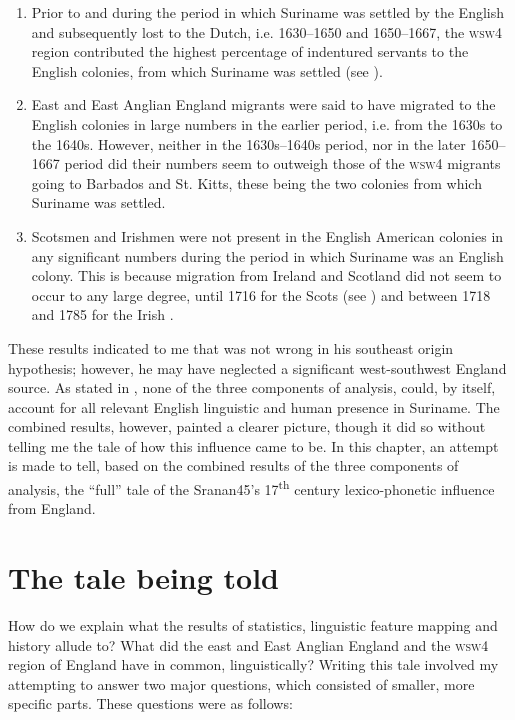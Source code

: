 \begin{enumerate}
\item{Prior to and during the period in which Suriname was settled by the English and subsequently lost to the Dutch, i.e. 1630--1650 and 1650--1667, the \textsc{wsw4} region contributed the highest percentage of indentured servants to the English colonies, from which Suriname was settled (see ).}
\item{East and East Anglian England migrants were said to have migrated to the English colonies in large numbers in the earlier period, i.e. from the 1630s to the 1640s. However, neither in the 1630s--1640s period, nor in the later 1650--1667 period did their numbers seem to outweigh those of the \textsc{wsw4} migrants going to Barbados and St. Kitts, these being the two colonies from which Suriname was settled.}
\item{Scotsmen and Irishmen were not present in the English American colonies in any significant numbers during the period in which Suriname was an English colony. This is because migration from Ireland and Scotland did not seem to occur to any large degree, until 1716 for the Scots (see \citealt{Dobson05}) and between 1718 and 1785 for the Irish \citep{Griffin01}.}
\end{enumerate}

These results indicated to me that \citet{Smith87, Smith08} was not wrong in his southeast origin hypothesis; however, he may have neglected a significant west-southwest England source. As stated in , none of the three components of analysis, could, by itself, account for all relevant English linguistic and human presence in Suriname. The combined results, however, painted a clearer picture, though it did so without telling me the tale of how this influence came to be. In this chapter, an attempt is made to tell, based on the combined results of the three components of analysis, the ``full'' tale of the Sranan45's 17\textsuperscript{th} century lexico-phonetic influence from England.

\section{The tale being told}\label{7.2}
How do we explain what the results of statistics, linguistic feature mapping and history allude to? What did the east and East Anglian England and the \textsc{wsw4} region of England have in common, linguistically? Writing this tale involved my attempting to answer two major questions, which consisted of smaller, more specific parts. These questions were as follows:

